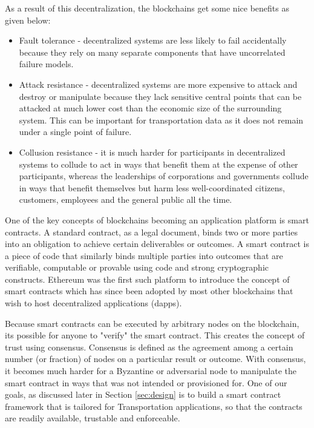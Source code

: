 As a result of this decentralization, the blockchains get some nice benefits as given below:
\begin{itemize}

    \item Fault tolerance - decentralized systems are less likely to fail accidentally because they rely on many separate
components that have uncorrelated failure models.
    \item Attack resistance - decentralized systems are more expensive to attack and destroy or manipulate because they lack
sensitive central points that can be attacked at much lower cost than the economic size of the surrounding system. This
can be important for transportation data as it does not remain under a single point of failure.
    \item Collusion resistance - it is much harder for participants in decentralized systems to collude to act in ways that
benefit them at the expense of other participants, whereas the leaderships of corporations and governments collude in
ways that benefit themselves but harm less well-coordinated citizens, customers, employees and the general public all
the time.
\end{itemize}

One of the key concepts of blockchains becoming an application platform is smart contracts. A standard contract, as a
legal document, binds two or more parties into an obligation to achieve certain deliverables or outcomes. A smart
contract is a piece of code that similarly binds multiple parties into outcomes that are verifiable, computable or
provable using code and strong cryptographic constructs. Ethereum was the first such platform to introduce the concept
of smart contracts which has since been adopted by most other blockchains that wish to host decentralized applications
(dapps).

Because smart contracts can be executed by arbitrary nodes on the blockchain, its possible for anyone to "verify" the
smart contract. This creates the concept of trust using consensus. Consensus is defined as the agreement among a
certain number (or fraction) of nodes on a particular result or outcome. With consensus, it becomes much harder for a
Byzantine or adversarial node \cite{lamport_byz} to manipulate the smart contract in ways that was not intended or
provisioned for. One of our goals, as discussed later in Section \ref{sec:design} is to build a smart contract framework
that is tailored for Transportation applications, so that the contracts are readily available, trustable and
enforceable. 

